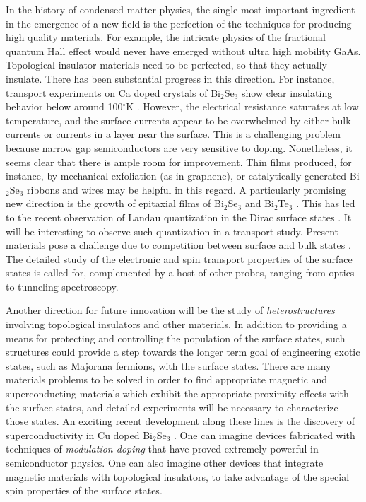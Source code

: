 \documentclass[twocolumn,floatfix,showpacs,rmp,aps]{revtex4}
\begin{document}
	In the history of condensed matter physics, the single most important
	ingredient in the emergence of a new field is the perfection of the
	techniques for producing high quality materials.  For example, the
	intricate physics of the fractional quantum Hall effect would never
	have emerged without ultra high mobility GaAs. Topological insulator
	materials need to be perfected, so that they actually insulate. There
	has been substantial progress in this direction.  For instance,
	transport experiments on Ca doped crystals of Bi$_2$Se$_3$ show clear
	insulating behavior below around 100$^\circ$K \cite{checkelsky09}.
	However, the electrical resistance saturates at low temperature,
	and the surface currents appear to be overwhelmed by either bulk
	currents or currents in a layer near the surface.  This is
	a challenging problem because narrow gap semiconductors are very
	sensitive to doping. Nonetheless, it seems clear that there is ample
	room for improvement. Thin films produced, for instance, by
	mechanical exfoliation (as in graphene), or catalytically generated
	Bi$_2$Se$_3$ ribbons and wires \cite{peng09} may be helpful in this
	regard.  A particularly promising new direction is the growth of
	epitaxial films of Bi$_2$Se$_3$
	\cite{zhangg09,zhangy10} and Bi$_2$Te$_3$ \cite{li10}. This has led to the recent observation of Landau
	quantization in the Dirac surface states \cite{cheng10,hanaguri10}. It will be interesting
	to observe such quantization in a transport study.  Present materials pose
	a challenge due to competition between surface and bulk states \cite{taskin09,checkelsky09}.
	The detailed
	study of the electronic and spin transport properties of the surface
	states is called for, complemented by a host of other probes, ranging
	from optics to tunneling spectroscopy.
	
	Another direction for future innovation will be the study of {\it
		heterostructures} involving topological insulators and other
	materials.  In addition to providing a means for protecting and controlling the
	population of the surface states, such structures could provide a step towards the
	longer term goal of engineering exotic states, such as Majorana
	fermions, with the surface states.  There are many materials problems
	to be solved in order to find appropriate magnetic and
	superconducting materials which exhibit the appropriate proximity
	effects with the surface states, and detailed experiments will be
	necessary to characterize those states.  An exciting recent development
	along these lines is the discovery of superconductivity in Cu doped
	Bi$_2$Se$_3$ \cite{hor10a}.  One can imagine devices fabricated
	with techniques of {\it modulation doping} that have proved extremely
	powerful in semiconductor physics.  One can also imagine other devices that
	integrate magnetic materials with topological insulators, to take advantage of
	the special spin properties of the surface states.
	
\end{document}
